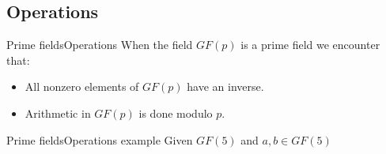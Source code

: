 \subsection{Operations}

\begin{frame}[t]{Prime fields}{Operations}
	When the field $GF(p)$ is a prime field we encounter that:
	
	\begin{itemize}
		\item All nonzero elements of $GF(p)$ have an inverse.
		\item Arithmetic in $GF(p)$ is done modulo $p$. 
	\end{itemize}
	
\end{frame}

\begin{frame}[t]{Prime fields}{Operations example}
	Given $GF(5)$ and $a, b \in GF(5)$
	\medskip
	

\end{frame}
